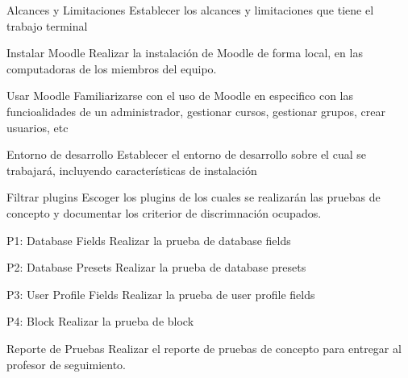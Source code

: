 \vfill\null\columnbreak

\begin{Actividad}{Alcances y Limitaciones}{%
    Establecer los alcances y limitaciones que tiene el trabajo terminal}
    \PBitem {}%
\end{Actividad}

\begin{Actividad}{Instalar Moodle}{%
    Realizar la instalación de Moodle de forma local, en las computadoras de los miembros del equipo.}
    \PBitem {}%
\end{Actividad}

\begin{Actividad}{Usar Moodle}{%
    Familiarizarse con el uso de Moodle en especifico con las funcioalidades de un administrador, gestionar cursos, gestionar grupos, crear usuarios, etc}
    \PBitem {}%
\end{Actividad}


\begin{Actividad}{Entorno de desarrollo}{%
    Establecer el entorno de desarrollo sobre el cual se trabajará, incluyendo características de instalación}
    \PBitem {}%
\end{Actividad}

\begin{Actividad}{Filtrar plugins}{%
    Escoger los plugins de los cuales se realizarán las pruebas de concepto y documentar los criterior de discrimnación ocupados.}
    \PBitem {}%
\end{Actividad}

\begin{Actividad}{P1: Database Fields}{%
    Realizar la prueba de database fields}
    \PBitem {}%
\end{Actividad}

\begin{Actividad}{P2: Database Presets}{%
    Realizar la prueba de database presets}
    \PBitem {}%
\end{Actividad}

\begin{Actividad}{P3: User Profile Fields}{%
    Realizar la prueba de user profile fields}
    \PBitem {}%
\end{Actividad}

\begin{Actividad}{P4: Block}{%
    Realizar la prueba de block}
    \PBitem {}%
\end{Actividad}

\begin{Actividad}{Reporte de Pruebas}{%
    Realizar el reporte de pruebas de concepto para entregar al profesor de seguimiento. }
    \PBitem {}%
\end{Actividad}